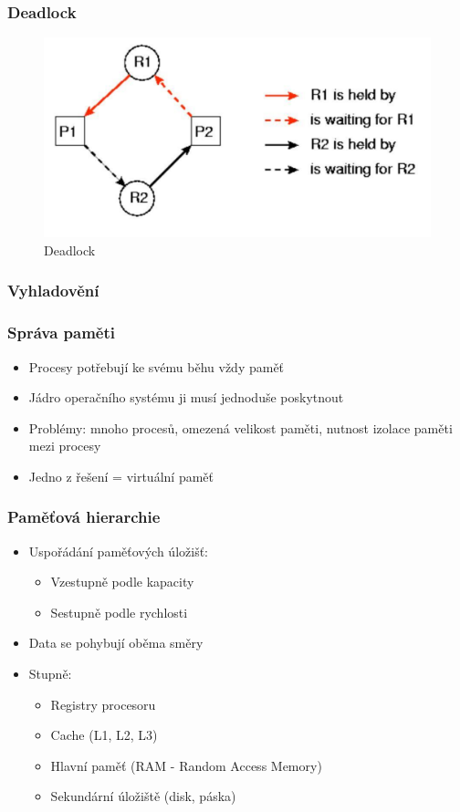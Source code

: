 \documentclass[professionalfonts,svgnames]{beamer}
\begin{document}
\begin{frame}
\frametitle{Deadlock}
\begin{figure}[h]
	\includegraphics[scale=0.4]{fig/deadlock}
	\caption{Deadlock}
	\label{dd}
\end{figure}
\end{frame}

\begin{frame}
\frametitle{Vyhladovění}
\end{frame}

\begin{frame}
\frametitle{Správa paměti}
\begin{itemize} %
	\item Procesy potřebují ke svému běhu vždy paměť
	\item Jádro operačního systému ji musí jednoduše poskytnout
	\item Problémy: mnoho procesů, omezená velikost paměti, nutnost izolace paměti mezi procesy
	\item Jedno z řešení = virtuální paměť
\end{itemize}
\end{frame}

\begin{frame}
\frametitle{Paměťová hierarchie}
\begin{itemize}
\item Uspořádání paměťových úložišť:
	\begin{itemize}
		\item Vzestupně podle kapacity
		\item Sestupně podle rychlosti
	\end{itemize}
\item Data se pohybují oběma směry
\item Stupně:
	\begin{itemize}
	\item Registry procesoru
	\item Cache (L1, L2, L3)
	\item Hlavní paměť (RAM - Random Access Memory)
	\item Sekundární úložiště (disk, páska)
	\end{itemize}
\end{itemize}
\end{frame}
\end{document}
